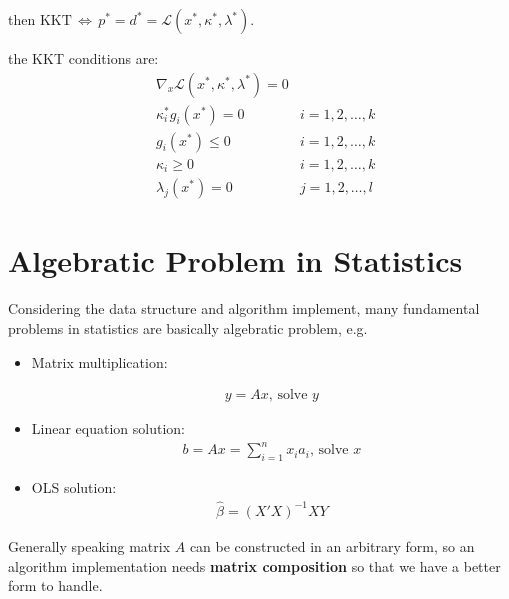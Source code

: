     then $ \mathrm{KKT}\,\Leftrightarrow\, p^*=d^*=\mathcal{L}(x^*,\kappa ^*,\lambda ^*)  $.

    the KKT conditions are:
\begin{equation}\label{EqaKKTCondition}
    \begin{aligned}
    &\nabla_x\mathcal{L}(x^*,\kappa ^*,\lambda ^*)=0&\\
    &\kappa ^*_ig_i(x^*)=0&i=1,2,\ldots,k\\
    &g_i(x^*)\leq 0&i=1,2,\ldots,k\\
    &\kappa _i\geq 0&i=1,2,\ldots,k\\
    &\lambda _j(x^*)=0&j=1,2,\ldots,l
    \end{aligned}
\end{equation}

    
    
    
     







\section{Algebratic Problem in Statistics}\label{SubSectionAlgebraticProblemInStatistics}
   Considering the data structure and algorithm implement, many fundamental problems in statistics are basically algebratic problem, e.g.

\begin{itemize}[topsep=2pt,itemsep=0pt]
    \item Matrix multiplication:
    
    \begin{align}
        y=Ax,\,\text{solve } y 
    \end{align}
    \item Linear equation solution:
    \begin{align}
        b=Ax=\sum_{i=1}^nx_ia_i,\, \text{solve } x
    \end{align}
    \item OLS solution:
    \begin{align}
        \hat{\beta }=(X'X)^{-1}XY 
    \end{align}
\end{itemize}

    Generally speaking matrix $ A $ can be constructed in an arbitrary form, so an algorithm implementation needs \textbf{matrix composition} so that we have a better form to handle.
    




